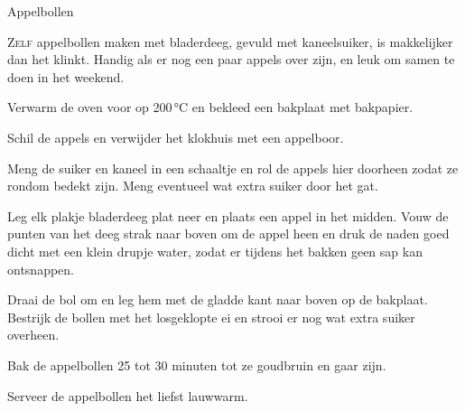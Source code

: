\begin{recipe}{Appelbollen}


\lettrine{Z}{elf} appelbollen maken met bladerdeeg, gevuld met kaneelsuiker, is
makkelijker dan het klinkt. Handig als er nog een paar appels over zijn, en leuk
om samen te doen in het weekend.

\begin{ingredients}
\end{ingredients}

\begin{steps}
  \item Verwarm de oven voor op 200\,°C en bekleed een bakplaat met bakpapier.
  \item Schil de appels en verwijder het klokhuis met een appelboor.
  \item Meng de suiker en kaneel in een schaaltje en rol de appels hier
        doorheen zodat ze rondom bedekt zijn. Meng eventueel wat extra suiker
        door het gat.
  \item Leg elk plakje bladerdeeg plat neer en plaats een appel in het
        midden. Vouw de punten van het deeg strak naar boven om de appel heen
        en druk de naden goed dicht met een klein drupje water, zodat er
        tijdens het bakken geen sap kan ontsnappen.
  \item Draai de bol om en leg hem met de gladde kant naar boven op de
        bakplaat. Bestrijk de bollen met het losgeklopte ei en strooi er nog
        wat extra suiker overheen.
  \item Bak de appelbollen 25 tot 30 minuten tot ze goudbruin en gaar zijn.
  \item Serveer de appelbollen het liefst lauwwarm.
\end{steps}
\end{recipe}

